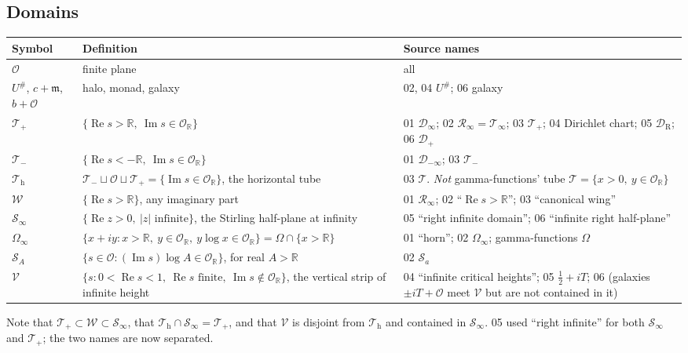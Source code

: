 \documentclass[11pt,a4paper]{article}
\numberwithin{equation}{section}
\theoremstyle{definition}
\theoremstyle{remark}
\newcommand{\R}{\mathbb R}
\newcommand{\OO}{\mathcal O}
\newcommand{\mm}{\mathfrak m}
\renewcommand{\Re}{\operatorname{Re}}
\renewcommand{\Im}{\operatorname{Im}}
\newcommand{\Tp}{\mathcal T_{+}}
\newcommand{\Tm}{\mathcal T_{-}}
\newcommand{\Th}{\mathcal T_{\mathrm h}}
\newcommand{\Wing}{\mathcal W}
\newcommand{\Sinf}{\mathcal S_{\infty}}
\newcommand{\Om}{\Omega_{\infty}}
\newcommand{\Vs}{\mathcal V}
\newcommand{\SA}{\mathcal S_{A}}
\begin{document}
\subsection{Domains}\label{gz:sec:domains}
\begin{center}\small
\begin{longtable}{@{}P{0.14\textwidth}P{0.38\textwidth}P{0.40\textwidth}@{}}
\toprule
Symbol & Definition & Source names\\
\midrule
\endhead
$\OO$ & finite plane & all\\
$U^\#$, $c+\mm$, $b+\OO$ & halo, monad, galaxy & 02, 04 $U^\#$; 06 galaxy\\
$\Tp$ & $\{\Re s>\R,\ \Im s\in\OO_\R\}$ & 01 $\mathcal D_\infty$; 02 $\mathcal R_\infty=\mathcal T_\infty$; 03 $\mathcal T_+$; 04 Dirichlet chart; 05 $\mathcal D_{\mathrm R}$; 06 $\mathcal D_+$\\
$\Tm$ & $\{\Re s<-\R,\ \Im s\in\OO_\R\}$ & 01 $\mathcal D_{-\infty}$; 03 $\mathcal T_-$\\
$\Th$ & $\Tm\sqcup\OO\sqcup\Tp=\{\Im s\in\OO_\R\}$, the horizontal tube & 03 $\mathcal T$. \emph{Not} gamma-functions' tube $\mathcal T=\{x>0,\ y\in\OO_\R\}$\\
$\Wing$ & $\{\Re s>\R\}$, any imaginary part & 01 $\mathcal R_\infty$; 02 ``$\Re s>\R$''; 03 ``canonical wing''\\
$\Sinf$ & $\{\Re z>0,\ |z|\text{ infinite}\}$, the Stirling half-plane at infinity & 05 ``right infinite domain''; 06 ``infinite right half-plane''\\
$\Om$ & $\{x+iy:x>\R,\ y\in\OO_\R,\ y\log x\in\OO_\R\}=\Omega\cap\{x>\R\}$ & 01 ``horn''; 02 $\Omega_\infty$; gamma-functions $\Omega$\\
$\SA$ & $\{s\in\OO:(\Im s)\log A\in\OO_\R\}$, for real $A>\R$ & 02 $\mathcal S_a$\\
$\Vs$ & $\{s:0<\Re s<1,\ \Re s\text{ finite},\ \Im s\notin\OO_\R\}$, the vertical strip of infinite height & 04 ``infinite critical heights''; 05 $\tfrac12+iT$; 06 (galaxies $\pm iT+\OO$ meet $\Vs$ but are not contained in it)\\
\bottomrule
\end{longtable}
\addtocounter{table}{-1}
\end{center}
Note that $\Tp\subset\Wing\subset\Sinf$, that $\Th\cap\Sinf=\Tp$, and
that $\Vs$ is disjoint from $\Th$ and contained in $\Sinf$. 05 used ``right
infinite'' for both $\Sinf$ and $\Tp$; the two names are now separated.
\end{document}
